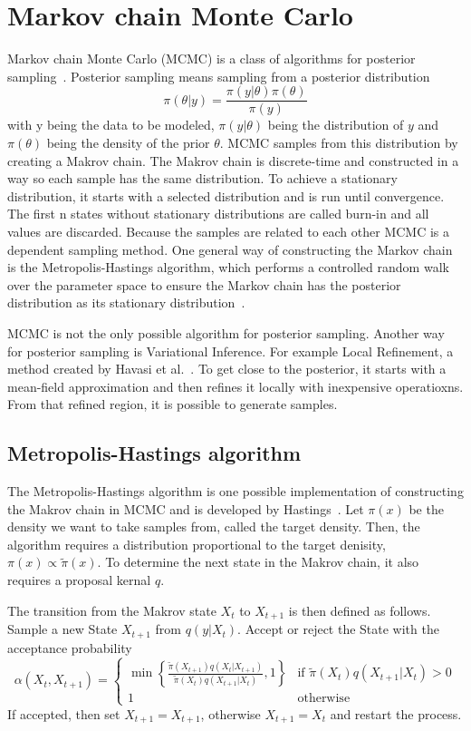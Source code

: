 \section{Markov chain Monte Carlo}
Markov chain Monte Carlo (MCMC) is a class of algorithms 
for posterior sampling~\cite{wang2020brief}. 
Posterior sampling means sampling from a posterior distribution \[
\pi(\theta|y)=\frac{\pi(y|\theta)\pi(\theta)}{\pi(y)}
\]
with y being the data to be modeled, $\pi(y|\theta)$ 
being the distribution of $y$ and $\pi(\theta)$ 
being the density of the prior $\theta$.
MCMC samples from this distribution by creating a Makrov chain. 
The Makrov chain is discrete-time and constructed in a way so each sample 
has the same distribution. To achieve a stationary distribution, 
it starts with a selected distribution and is run until convergence. 
The first n states without stationary distributions are called 
burn-in and all values are discarded. Because the samples are 
related to each other MCMC is a dependent sampling method.
One general way of constructing the Markov chain is the 
Metropolis-Hastings algorithm, which performs a controlled 
random walk over the parameter space to ensure the Markov
chain has the posterior distribution as its stationary distribution~\cite{wang2020brief}. 

MCMC is not the only possible algorithm for posterior sampling. 
Another way for posterior sampling is Variational Inference. 
For example Local Refinement, a method created by 
Havasi et al.~\cite{havasi2021sampling}. 
To get close to the posterior, 
it starts with a mean-field approximation and then refines it 
locally with inexpensive operatioxns. From that refined region, 
it is possible to generate samples.
\subsection{Metropolis-Hastings algorithm}
The Metropolis-Hastings algorithm is one possible implementation of constructing the Makrov chain in MCMC and 
is developed by Hastings~\cite{hastings1970}.
Let $\pi(x)$ be the density we want to take samples from, called the target density.
Then, the algorithm requires a distribution proportional to the target denisity, $\pi(x)\propto\tilde{\pi}(x)$.
To determine the next state in the Makrov chain, it also requires a proposal kernal $q$.

The transition from the Makrov state $X_t$ to $X_{t+1}$ is then defined as follows.
Sample a new State  $X_{t+1}$ from $q(y | X_t)$. 
Accept or reject the State with the acceptance probability
\[ 
    \alpha(X_t, X_{t+1}) = 
    \begin{cases}
        \min \left\{ \frac{\tilde{\pi}(X_{t+1}) q(X_t|X_{t+1} )}{\tilde{\pi}(X_t) q(X_{t+1}|X_t)}, 1 \right\} & \text{if } \tilde{\pi}(X_t)q(X_{t+1}|X_t)>0 \\
        1 & \text{otherwise}
    \end{cases}     
\]
If accepted, then set $X_{t+1}=X_{t+1}$, otherwise $X_{t+1}  = X_t$ and restart the process.


